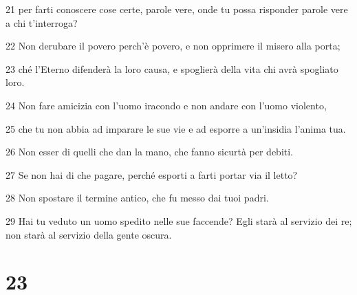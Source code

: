 \par 21 per farti conoscere cose certe, parole vere, onde tu possa risponder parole vere a chi t'interroga?
\par 22 Non derubare il povero perch'è povero, e non opprimere il misero alla porta;
\par 23 ché l'Eterno difenderà la loro causa, e spoglierà della vita chi avrà spogliato loro.
\par 24 Non fare amicizia con l'uomo iracondo e non andare con l'uomo violento,
\par 25 che tu non abbia ad imparare le sue vie e ad esporre a un'insidia l'anima tua.
\par 26 Non esser di quelli che dan la mano, che fanno sicurtà per debiti.
\par 27 Se non hai di che pagare, perché esporti a farti portar via il letto?
\par 28 Non spostare il termine antico, che fu messo dai tuoi padri.
\par 29 Hai tu veduto un uomo spedito nelle sue faccende? Egli starà al servizio dei re; non starà al servizio della gente oscura.

\chapter{23}

